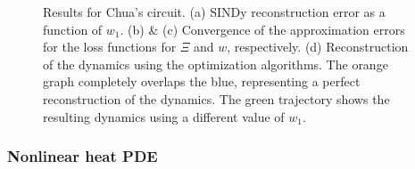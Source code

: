 \documentclass
[
    a4paper,
    DIV=11,
    abstract=true,
    11pt,
]
{scrartcl}
\theoremstyle{definition}
\begin{document}
\begin{figure}
\begin{minipage}[t]{0.4\linewidth}
{    }
    \end{minipage}
    \begin{minipage}[t]{0.4\linewidth}
    \centering
    \end{minipage}
    \caption{Results for Chua's circuit. (a) SINDy reconstruction error as a function of $ w_1 $. (b) \& (c) Convergence of the approximation errors for the loss functions for $\Xi$ and $w$, respectively. (d) Reconstruction of the dynamics using the optimization algorithms. The orange graph completely overlaps the blue, representing a perfect reconstruction of the dynamics. The green trajectory shows the resulting dynamics using a different value of $ w_1 $.}
    \label{fig:modchua_results}
\end{figure}

\subsubsection{Nonlinear heat PDE}
\end{document}

